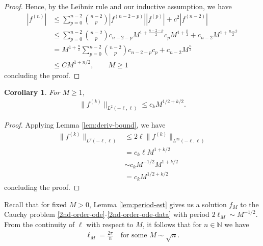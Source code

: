 \documentclass[12pt,reqno]{amsart}
\numberwithin{equation}{section}  %
\newtheorem{corollary}[theorem]{Corollary}
\begin{document}
\begin{proof}
%
%
Hence, by the Leibniz rule and our inductive assumption, we have
%
%
\begin{equation*}
\begin{split}
  | f^{(n)} |
  & \le  \sum_{p=0}^{n-2} \binom{n-2}{p} | f^{(n-2-p)} | |
  f^{(p)} | + c^{2} | f^{(n-2)} |
  \\
  & \le  \sum_{p=0}^{n-2} \binom{n-2}{p} c_{n-2-p}M^{1 +
  \frac{n-2-p}{2}}c_{p}M^{1 + \frac{p}{2}} + c_{n-2} M^{1 + \frac{n-2}{2}}
  \\
  & = M^{1 + \frac{n}{2}} \sum_{p=0}^{n-2} \binom{n-2}{p} c_{n-2-p}c_{p}
  + c_{n-2} M^{\frac{n}{2}}
  \\
  & \le C M^{1 + n/2}, \qquad M \ge 1
\end{split}
\end{equation*}
%
%
concluding the proof.
\end{proof}
%
%
%
%
%
%                
%
%
%
%
\begin{corollary}
For $M \ge 1$,
%
%
\begin{equation*}
\begin{split}
  \| f^{(k)} \|_{L^{2}(-\ell, \ell)} \le c_{k} M^{1/2 + k/2}.
\end{split}
\end{equation*}
%
%
\label{cor:sob-norm-bound}
\end{corollary}
%
%
%
%
\begin{proof}
  Applying Lemma \ref{lem:deriv-bound}, we have
  \begin{equation*}
  \begin{split}
    \| f^{(k)} \|_{L^{2}(-\ell, \ell)}
    & \le 2 \ell \| f^{(k)} \|_{L^{\infty}(-\ell, \ell)}
    \\
    & =  c_{k} \ell M^{1 + k/2}
    \\
    & \sim c_{k} M^{-1/2} M^{1 + k/2}
    \\
    & = c_{k} M^{1/2 + k/2}
  \end{split}
  \end{equation*}
  concluding the proof.
\end{proof}
%
%
Recall that for fixed $M > 0$, Lemma \ref{lem:period-est} gives us a
solution $f_{M}$ to the Cauchy problem
\eqref{2nd-order-ode}-\eqref{2nd-order-ode-data} with period $2 \ell_{M} \sim
M^{-1/2}$. From the continuity of $\ell$ with respect to $M$, it follows that for $n \in \mathbb{N}$ we have 
%
%
\begin{equation*}
\begin{split}
  \ell_{M} = \frac{2\pi}{n} \quad \text{for some } M \sim \sqrt{n}.
\end{split}
\end{equation*}
\end{document}
